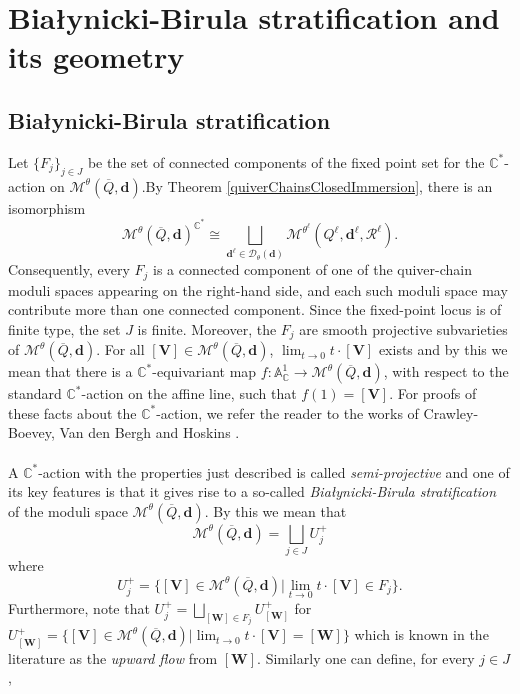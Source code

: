 \documentclass{amsart}
\theoremstyle{plain}
\numberwithin{equation}{section}
\theoremstyle{definition}
\theoremstyle{remark}
\begin{document}
	\section{Bia\l ynicki-Birula stratification and its geometry}\label{BialynickiBirulaSection}
	\subsection{Bia\l ynicki-Birula stratification}\label{BialynickiBirulaStratification}
	
	Let $\{F_j\}_{j\in J}$ be the set of connected components of the fixed point set for the $\mathbb{C}^*$-action on $\mathcal{M}^{\theta}(\overline{Q},\mathbf{d})$.By Theorem \ref{quiverChainsClosedImmersion}, there is an isomorphism
	\[
	\mathcal M^\theta(\overline Q,\mathbf d)^{\mathbb C^*}
	\cong
	\bigsqcup_{\mathbf d^\ell\in\mathscr D_\theta(\mathbf d)}
	\mathcal M^{\theta^\ell}
	(Q^\ell,\mathbf d^\ell,\mathcal R^\ell).
	\]
	Consequently, every \(F_j\) is a connected component of one of the
	quiver-chain moduli spaces appearing on the right-hand side, and each such
	moduli space may contribute more than one connected component. Since the
	fixed-point locus is of finite type, the set \(J\) is finite. Moreover, the $F_j$ are smooth projective subvarieties of $\mathcal{M}^{\theta}(\overline{Q},\mathbf{d})$. For all $[\mathbf{V}]\in \mathcal{M}^{\theta}(\overline{Q},\mathbf{d})$, $\lim_{t\to 0}t\cdot [\mathbf{V}]$ exists and by this we mean that there is a $\mathbb{C}^*$-equivariant map $f:\mathbb{A}^1_\mathbb{C}\to \mathcal{M}^{\theta}(\overline{Q},\mathbf{d})$, with respect to the standard $\mathbb{C}^*$-action on the affine line, such that $f(1)=[\mathbf{V}]$. For proofs of these facts about the $\mathbb{C}^*$-action, we refer the reader to the works of Crawley-Boevey, Van den Bergh and Hoskins \cite{CrawleyBoeveyVanDenBergh} \cite{HoskinsSurvey}. 
	\\
	\\
	A $\mathbb{C}^*$-action with the properties just described is called \emph{semi-projective} \cite{HauselRodriguezVillegas} and one of its key features is that it gives rise to a so-called \emph{Bia\l ynicki-Birula stratification} of the moduli space $\mathcal{M}^{\theta}(\overline{Q},\mathbf{d})$. By this we mean that 
	$$
	\mathcal{M}^{\theta}(\overline{Q},\mathbf{d})=\bigsqcup_{j\in J}U_j ^+
	$$
	where $$U_j^+=\{[\mathbf{V}]\in\mathcal{M}^{\theta}(\overline{Q},\mathbf{d}) |  \lim_{t\to 0}t\cdot [\mathbf{V}]\in F_j\}.$$ Furthermore, note that $U_j^+=\bigsqcup_{[\mathbf{W}]\in F_j}U_{[\mathbf{W}]}^+$ for $U_{[\mathbf{W}]}^+=\{[\mathbf{V}]\in\mathcal{M}^{\theta}(\overline{Q},\mathbf{d}) |  \lim_{t\to 0}t\cdot [\mathbf{V}]=[\mathbf{W}]\}$ which is known in the literature as the \emph{upward flow} from $[\mathbf{W}]$. Similarly one can define, for every $j\in J$, 
\end{document}
